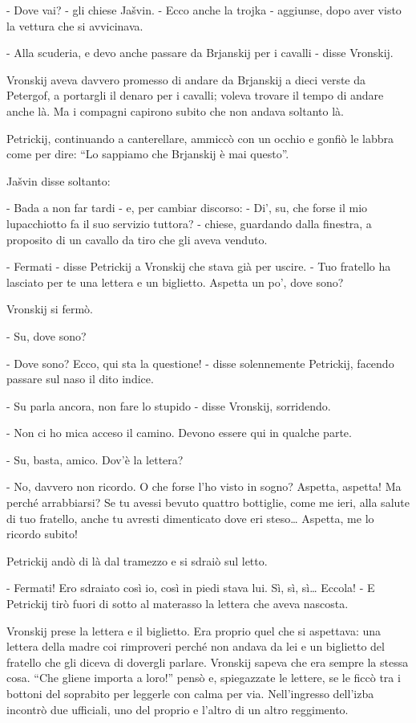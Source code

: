 - Dove vai? - gli chiese Jašvin. - Ecco anche la trojka - aggiunse, dopo aver visto la vettura che si avvicinava. 

- Alla scuderia, e devo anche passare da Brjanskij per i cavalli - disse Vronskij. 

Vronskij aveva davvero promesso di andare da Brjanskij a dieci verste da Petergof, a portargli il denaro per i cavalli; voleva trovare il tempo di andare anche là. Ma i compagni capirono subito che non andava soltanto là. 

Petrickij, continuando a canterellare, ammiccò con un occhio e gonfiò le labbra come per dire: ``Lo sappiamo che Brjanskij è mai questo''. 

Jašvin disse soltanto: 

- Bada a non far tardi - e, per cambiar discorso: - Di', su, che forse il mio lupacchiotto fa il suo servizio tuttora? - chiese, guardando dalla finestra, a proposito di un cavallo da tiro che gli aveva venduto. 

- Fermati - disse Petrickij a Vronskij che stava già per uscire. - Tuo fratello ha lasciato per te una lettera e un biglietto. Aspetta un po', dove sono? 

Vronskij si fermò. 

- Su, dove sono? 

- Dove sono? Ecco, qui sta la questione! - disse solennemente Petrickij, facendo passare sul naso il dito indice. 

- Su parla ancora, non fare lo stupido - disse Vronskij, sorridendo. 

- Non ci ho mica acceso il camino. Devono essere qui in qualche parte. 

- Su, basta, amico. Dov'è la lettera? 

- No, davvero non ricordo. O che forse l'ho visto in sogno? Aspetta, aspetta! Ma perché arrabbiarsi? Se tu avessi bevuto quattro bottiglie, come me ieri, alla salute di tuo fratello, anche tu avresti dimenticato dove eri steso\ldots{} Aspetta, me lo ricordo subito! 

Petrickij andò di là dal tramezzo e si sdraiò sul letto. 

- Fermati! Ero sdraiato così io, così in piedi stava lui. Sì, sì, sì\ldots{} Eccola! - E Petrickij tirò fuori di sotto al materasso la lettera che aveva nascosta. 

Vronskij prese la lettera e il biglietto. Era proprio quel che si aspettava: una lettera della madre coi rimproveri perché non andava da lei e un biglietto del fratello che gli diceva di dovergli parlare. Vronskij sapeva che era sempre la stessa cosa. ``Che gliene importa a loro!'' pensò e, spiegazzate le lettere, se le ficcò tra i bottoni del soprabito per leggerle con calma per via. Nell'ingresso dell'izba incontrò due ufficiali, uno del proprio e l'altro di un altro reggimento. 


